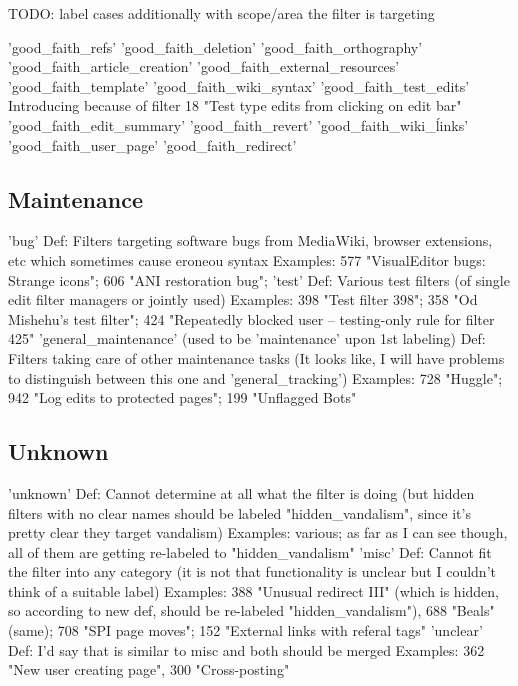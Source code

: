 TODO: label cases additionally with scope/area the filter is targeting

'good\_faith\_refs'
'good\_faith\_deletion'
'good\_faith\_orthography'
'good\_faith\_article\_creation'
'good\_faith\_external\_resources'
'good\_faith\_template'
'good\_faith\_wiki\_syntax'
'good\_faith\_test\_edits'
Introducing because of filter 18 "Test type edits from clicking on edit bar"
'good\_faith\_edit\_summary'
'good\_faith\_revert'
'good\_faith\_wiki\_ĺinks'
'good\_faith\_user\_page'
'good\_faith\_redirect'


\subsection{Maintenance}

'bug'
  Def: Filters targeting software bugs from MediaWiki, browser extensions, etc which sometimes cause eroneou syntax
  Examples: 577 "VisualEditor bugs: Strange icons"; 606 "ANI restoration bug";
'test'
  Def: Various test filters (of single edit filter managers or jointly used)
  Examples: 398 "Test filter 398"; 358 "Od Mishehu's test filter"; 424 "Repeatedly blocked user --  testing-only rule for filter 425"
'general\_maintenance' (used to be 'maintenance' upon 1st labeling)
  Def: Filters taking care of other maintenance tasks (It looks like, I will have problems to distinguish between this one and 'general\_tracking')
  Examples: 728 "Huggle"; 942 "Log edits to protected pages"; 199 "Unflagged Bots"

\subsection{Unknown}

'unknown'
  Def: Cannot determine at all what the filter is doing (but hidden filters with no clear names should be labeled "hidden\_vandalism", since it's pretty clear they target vandalism)
  Examples: various; as far as I can see though, all of them are getting re-labeled to "hidden\_vandalism"
'misc'
  Def: Cannot fit the filter into any category (it is not that functionality is unclear but I couldn't think of a suitable label)
  Examples: 388 "Unusual redirect III" (which is hidden, so according to new def, should be re-labeled "hidden\_vandalism"), 688 "Beals" (same); 708 "SPI page moves"; 152 "External links with referal tags"
'unclear'
  Def: I'd say that is similar to misc and both should be merged
  Examples: 362 "New user creating page", 300 "Cross-posting"

